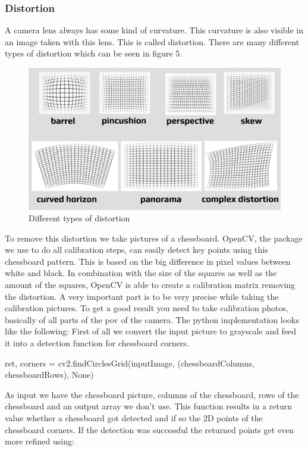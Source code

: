 \documentclass[journal,onecolumn]{IEEEtran}
\begin{document}
\subsubsection{Distortion}
\noindent
A camera lens always has some kind of curvature. This curvature is also visible in an image taken with this lens. This is called distortion. There are many different types of distortion which can be seen in figure 5.
\begin{figure}[H]
	\centering
	\includegraphics[scale=0.3]{distortion.jpg}
	\captionsetup{justification=centering}
	\caption{Different types of distortion}
\end{figure}
\noindent
To remove this distortion we take pictures of a chessboard. OpenCV, the package we use to do all calibration steps, can easily detect key points using this chessboard pattern. This is based on the big difference in pixel values between white and black. In combination with the size of the squares as well as the amount of the squares, OpenCV is able to create a calibration matrix removing the distortion.\newline
A very important part is to be very precise while taking the calibration pictures. To get a good result you need to take calibration photos, basically of all parts of the pov of the camera.\newline
The python implementation looks like the following:
First of all we convert the input picture to grayscale and feed it into a detection function for chessboard corners.
\begin{python}
ret, corners = cv2.findCirclesGrid(inputImage,
				  (chessboardColumns, chessboardRows),
				  None)
\end{python}
As input we have the chessboard picture, columns of the chessboard, rows of the chessboard and an output array we don't use.
This function results in a return value whether a chessboard got detected and if so the 2D points of the chessboard corners. If the detection was successful the returned points get even more refined using:
\end{document}
